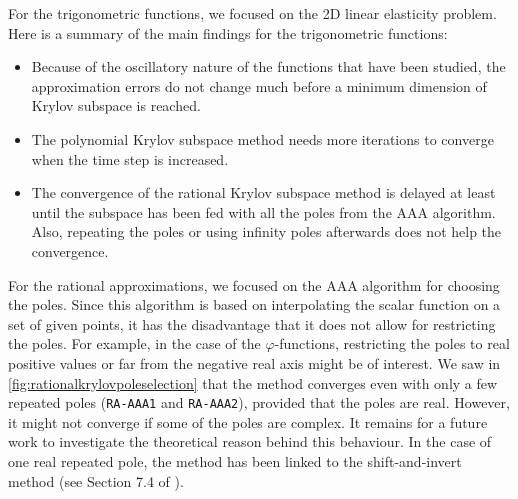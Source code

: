For the trigonometric functions, we focused on the 2D linear elasticity problem.
Here is a summary of the main findings for the trigonometric functions:
\begin{itemize}
    \item Because of the oscillatory nature of the functions that have been studied,
        the approximation errors do not change much before a minimum dimension of
        Krylov subspace is reached.
    \item The polynomial Krylov subspace method needs more iterations to converge
        when the time step is increased.
    \item The convergence of the rational Krylov subspace method is delayed at least
        until the subspace has been fed with all the poles from the AAA algorithm.
        Also, repeating the poles or using infinity poles afterwards does not help
        the convergence.
\end{itemize}

For the rational approximations, we focused on the AAA algorithm for choosing the poles.
Since this algorithm is based on interpolating the scalar function on a set of given
points, it has the disadvantage that it does not allow for restricting the poles. For example, in the case of the $\varphi$-functions, restricting the poles to real positive values
or far from the negative real axis might be of interest.
We saw in \autoref{fig:rationalkrylovpoleselection} that the method converges even with
only a few repeated poles (\texttt{RA-AAA1} and \texttt{RA-AAA2}), provided that the poles
are real. However, it might not converge if some of the poles are complex.
It remains for a future work to investigate the theoretical reason behind this behaviour.
In the case of one real repeated pole, the method has been linked to the shift-and-invert
method (see Section 7.4 of \cite{guttel2010rational}).
